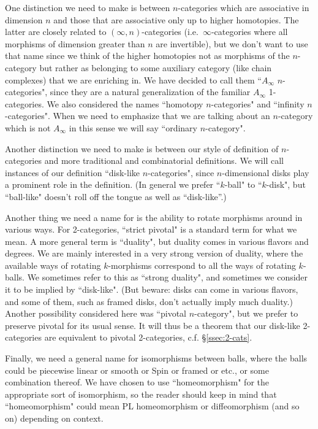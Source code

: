 One distinction we need to make is between $n$-categories which are associative in dimension $n$ and those
that are associative only up to higher homotopies.
The latter are closely related to $(\infty, n)$-categories (i.e.\ $\infty$-categories where all morphisms
of dimension greater than $n$ are invertible), but we don't want to use that name
since we think of the higher homotopies not as morphisms of the $n$-category but
rather as belonging to some auxiliary category (like chain complexes)
that we are enriching in.
We have decided to call them ``$A_\infty$ $n$-categories", since they are a natural generalization 
of the familiar $A_\infty$ 1-categories.
We also considered the names ``homotopy $n$-categories" and ``infinity $n$-categories".
When we need to emphasize that we are talking about an $n$-category which is not $A_\infty$ in this sense
we will say ``ordinary $n$-category".

Another distinction we need to make is between our style of definition of $n$-categories and
more traditional and combinatorial definitions.
We will call instances of our definition ``disk-like $n$-categories", since $n$-dimensional disks
play a prominent role in the definition.
(In general we prefer ``$k$-ball" to ``$k$-disk", but ``ball-like" doesn't roll off 
the tongue as well as ``disk-like''.)

Another thing we need a name for is the ability to rotate morphisms around in various ways.
For 2-categories, ``strict pivotal" is a standard term for what we mean.
A more general term is ``duality", but duality comes in various flavors and degrees.
We are mainly interested in a very strong version of duality, where the available ways of
rotating $k$-morphisms correspond to all the ways of rotating $k$-balls.
We sometimes refer to this as ``strong duality", and sometimes we consider it to be implied
by ``disk-like".
(But beware: disks can come in various flavors, and some of them, such as framed disks,
don't actually imply much duality.)
Another possibility considered here was ``pivotal $n$-category", but we prefer to preserve pivotal for its usual sense. 
It will thus be a theorem that our disk-like 2-categories 
are equivalent to pivotal 2-categories, c.f. \S \ref{ssec:2-cats}.

Finally, we need a general name for isomorphisms between balls, where the balls could be
piecewise linear or smooth or Spin or framed or etc., or some combination thereof.
We have chosen to use ``homeomorphism" for the appropriate sort of isomorphism, so the reader should
keep in mind that ``homeomorphism" could mean PL homeomorphism or diffeomorphism (and so on)
depending on context.

